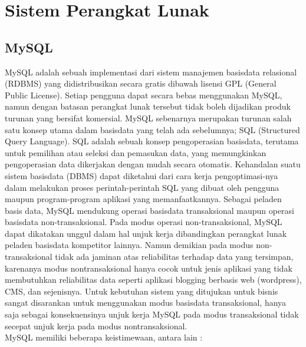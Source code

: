\documentclass{jtetiproposalskripsi}
\begin{document}
\section{Sistem Perangkat Lunak }
\subsection{MySQL}
MySQL adalah sebuah implementasi dari sistem manajemen basisdata relasional (RDBMS) yang didistribusikan secara gratis dibawah lisensi GPL (General Public License). Setiap pengguna dapat secara bebas menggunakan MySQL, namun dengan batasan perangkat lunak tersebut tidak boleh dijadikan produk turunan yang bersifat komersial. MySQL sebenarnya merupakan turunan salah satu konsep utama dalam basisdata yang telah ada sebelumnya; SQL (Structured Query Language). SQL adalah sebuah konsep pengoperasian basisdata, terutama untuk pemilihan atau seleksi dan pemasukan data, yang memungkinkan pengoperasian data dikerjakan dengan mudah secara otomatis. Kehandalan suatu sistem basisdata (DBMS) dapat diketahui dari cara kerja pengoptimasi-nya dalam melakukan proses perintah-perintah SQL yang dibuat oleh pengguna maupun program-program aplikasi yang memanfaatkannya. Sebagai peladen basis data, MySQL mendukung operasi basisdata transaksional maupun operasi basisdata non-transaksional. Pada modus operasi non-transaksional, MySQL dapat dikatakan unggul dalam hal unjuk kerja dibandingkan perangkat lunak peladen basisdata kompetitor lainnya. Namun demikian pada modus non-transaksional tidak ada jaminan atas reliabilitas terhadap data yang tersimpan, karenanya modus nontransaksional hanya cocok untuk jenis aplikasi yang tidak membutuhkan reliabilitas data seperti aplikasi blogging berbasis web (wordpress), CMS, dan sejenisnya. Untuk kebutuhan sistem yang ditujukan untuk bisnis sangat disarankan untuk menggunakan modus basisdata transaksional, hanya saja sebagai konsekuensinya unjuk kerja MySQL pada modus transaksional tidak secepat unjuk kerja pada modus nontransaksional.
\\
MySQL memiliki beberapa keistimewaan, antara lain :
\end{document}
